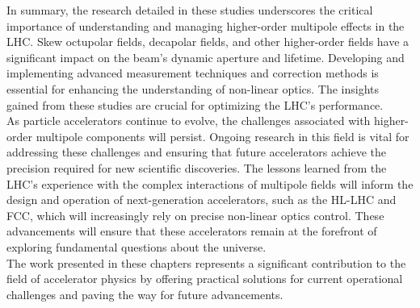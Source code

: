 {%
In summary, the research detailed in these studies underscores the critical importance of
understanding and managing higher-order multipole effects in the LHC. Skew octupolar fields,
decapolar fields, and other higher-order fields have a significant impact on the beam's dynamic
aperture and lifetime. Developing and implementing advanced measurement techniques and correction
methods is essential for enhancing the understanding of non-linear optics. The insights gained from
these studies are crucial for optimizing the LHC's performance.
\\
\indent
As particle accelerators continue to evolve, the challenges associated with higher-order multipole
components will persist. Ongoing research in this field is vital for addressing these challenges and
ensuring that future accelerators achieve the precision required for new scientific discoveries. The
lessons learned from the LHC's experience with the complex interactions of multipole fields will
inform the design and operation of next-generation accelerators, such as the HL-LHC and FCC, which
will increasingly rely on precise non-linear optics control. These advancements will ensure that
these accelerators remain at the forefront of exploring fundamental questions about the universe.
\\
\indent
The work presented in these chapters represents a significant contribution to the field of
accelerator physics by offering practical solutions for current operational challenges and paving
the way for future advancements.

} %


\chapter{}

\vspace{\vspacesummary}

